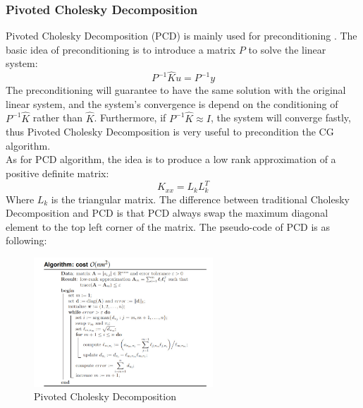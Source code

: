 \documentclass{article}
\begin{document}
\subsubsection{Pivoted Cholesky Decomposition}
Pivoted Cholesky Decomposition (PCD) is mainly used for preconditioning \cite{11}. The basic idea of preconditioning is to introduce a matrix $P$ to solve the linear system:
\begin{equation}
P^{-1}\hat{K}u=P^{-1}y
\end{equation}
The preconditioning will guarantee to have the same solution with the original linear system, and the system’s convergence is depend on the conditioning of $P^{-1}\hat{K}$ rather than $\hat{K}$. Furthermore, if $P^{-1}\hat{K}\approx I$, the system will converge fastly, thus Pivoted Cholesky Decomposition is very useful to precondition the CG algorithm. \\
As for PCD algorithm, the idea is to produce a low rank approximation of a positive definite matrix:
\begin{equation}
K_{xx}=L_kL_k^T
\end{equation}
Where $L_k$ is the triangular matrix. The difference between traditional Cholesky Decomposition and PCD is that PCD always swap the maximum diagonal element to the top left corner of the matrix. The pseudo-code of PCD is as following:
  \begin{figure}[H]
	\begin{center}
		\includegraphics[width=0.6\textwidth]{PCD}
	\end{center}
	\caption{Pivoted Cholesky Decomposition}
	\label{fig6}
\end{figure}
\end{document}
